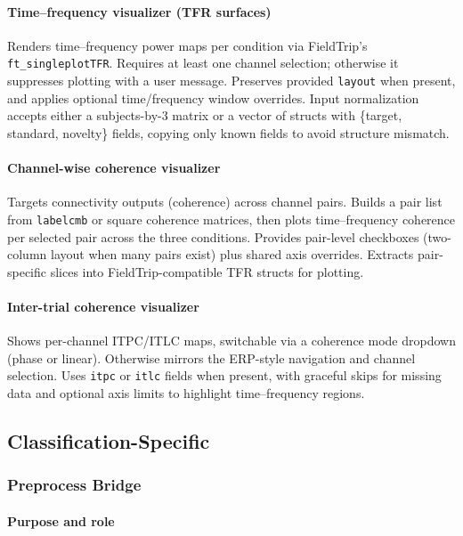 \documentclass[12pt]{report}
\begin{document}
\paragraph{Time–frequency visualizer (TFR surfaces)}\mbox{}

Renders time–frequency power maps per condition via FieldTrip’s \verb|ft_singleplotTFR|. Requires at least one channel selection; otherwise it suppresses plotting with a user message. Preserves provided \verb|layout| when present, and applies optional time/frequency window overrides. Input normalization accepts either a subjects-by-3 matrix or a vector of structs with \{target, standard, novelty\} fields, copying only known fields to avoid structure mismatch.

\paragraph{Channel-wise coherence visualizer}\mbox{}

Targets connectivity outputs (coherence) across channel pairs. Builds a pair list from \verb|labelcmb| or square coherence matrices, then plots time–frequency coherence per selected pair across the three conditions. Provides pair-level checkboxes (two-column layout when many pairs exist) plus shared axis overrides. Extracts pair-specific slices into FieldTrip-compatible TFR structs for plotting.

\paragraph{Inter-trial coherence visualizer}\mbox{}

Shows per-channel ITPC/ITLC maps, switchable via a coherence mode dropdown (phase or linear). Otherwise mirrors the ERP-style navigation and channel selection. Uses \verb|itpc| or \verb|itlc| fields when present, with graceful skips for missing data and optional axis limits to highlight time–frequency regions.


\subsection{Classification-Specific}

\subsubsection{Preprocess Bridge}

\paragraph{Purpose and role}\mbox{}
\end{document}

